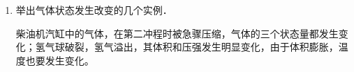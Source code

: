 \begin{enumerate}
\begin{solution}
\[\begin{split}
    p_{1}=p_0-\rho gh_1
    &=(1.013\x10^5-13.6\x10^3\x9.8\x0.20)\\
    &=7.4\x 10^4{\rm Pa}\\
    p_{2}=p_0+\rho_{\text{水}} gh_2
    &=(1.013\x10^5+1.0\x10^3\x9.8\x 20)\\
    &=2.97\x 10^5{\rm Pa}\\
    p_{3}=p_0+\rho_{\text{水}} gh_3
    &=[1.013\x10^5+1.0\x10^3\x9.8\x(0.85-0.10)]\\
    &=1.87\x 10^5{\rm Pa}\\
\end{split}\]  
\end{solution}
	\item 举出气体状态发生改变的几个实例．

\begin{solution}
 柴油机汽缸中的气体，在第二冲程时被急骤压缩，气体的三个状态量都发生变化；氢气球破裂，氢气溢出，其体积和压强发生明显变化，由于体积膨胀，温度也要发生变化。   
\end{solution}
\end{enumerate}

